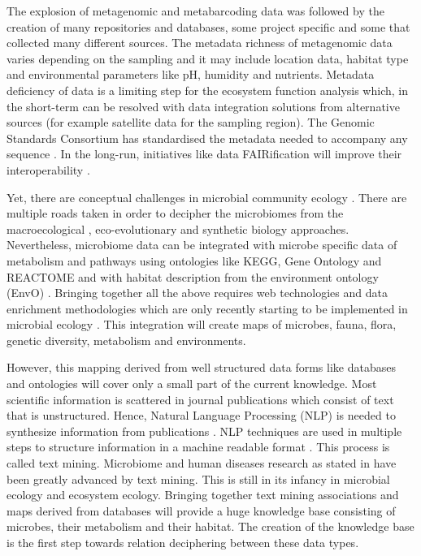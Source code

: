 The explosion of metagenomic and metabarcoding data was followed by the creation
of many repositories and databases, some project specific and some that
collected many different sources. The metadata richness of metagenomic data
varies depending on the sampling and it may include location data, habitat type
and environmental parameters like pH, humidity and nutrients. Metadata
deficiency of data is a limiting step for the ecosystem function analysis
which, in the short-term can be resolved with data integration solutions from
alternative sources (for example satellite data for the sampling region). 
The Genomic Standards Consortium has standardised the metadata needed 
to accompany any sequence \parencite{yilmaz2011minimum,Field2011}.
In the long-run, initiatives like data FAIRification will improve their
interoperability \parencite{wilkinson2016the-fair}.

Yet, there are conceptual challenges in microbial community ecology \parencite{prosser2020Conceptual}.
There are multiple roads taken in order to decipher the microbiomes from the macroecological \parencite{Mascarenhas2020}, 
eco-evolutionary \parencite{martiny2023Investigating, loreau2023Opportunities}
and synthetic biology \parencite{Leggieri2021} approaches.
Nevertheless, microbiome data can be integrated with microbe
specific data of metabolism and pathways using ontologies like KEGG, Gene
Ontology and REACTOME and with habitat description from the environment
ontology (EnvO) \parencite{buttigieg2016environment}. Bringing together all the above requires web technologies and
data enrichment methodologies which are only recently starting to be
implemented in microbial ecology \parencite{jiang2016Microbiome}. This integration
will create maps of microbes, fauna, flora, genetic diversity, metabolism and environments. 

However, this mapping derived from well structured data forms like databases
and ontologies will cover only a small part of the current knowledge. Most
scientific information is scattered in journal publications which consist of
text that is unstructured. Hence, Natural Language Processing (NLP) is needed to synthesize
information from publications \parencite{jensen2006Literature,}.
NLP techniques are used in multiple steps to structure information in a machine readable 
format \parencite{10.5555/1199003}. This process is called text mining.
Microbiome and
human diseases research as stated in \textcite{badal2019Challenges} have been
greatly advanced by text mining. This is still in its infancy in microbial
ecology and ecosystem ecology. Bringing together text mining associations and maps derived from
databases will provide a huge knowledge base consisting of microbes, their
metabolism and their habitat. The creation of the knowledge base is the first
step towards relation deciphering between these data types.

